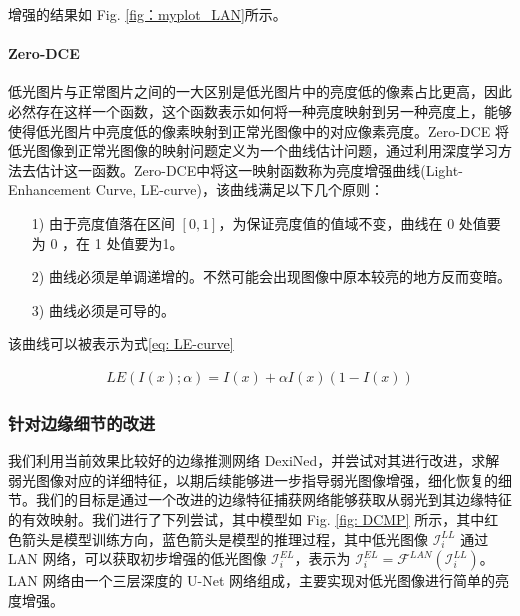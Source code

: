 \documentclass[a4paper]{ctexart}
\begin{document}
		增强的结果如 Fig. \ref{fig：myplot_LAN}所示。
		
		\paragraph{Zero-DCE} 
		
		低光图片与正常图片之间的一大区别是低光图片中的亮度低的像素占比更高，因此必然存在这样一个函数，这个函数表示如何将一种亮度映射到另一种亮度上，能够使得低光图片中亮度低的像素映射到正常光图像中的对应像素亮度。Zero-DCE 将低光图像到正常光图像的映射问题定义为一个曲线估计问题，通过利用深度学习方法去估计这一函数。Zero-DCE中将这一映射函数称为亮度增强曲线(Light-Enhancement Curve, LE-curve)，该曲线满足以下几个原则：
		
		\begin{itemize}
			\item [1)]
			由于亮度值落在区间 $[0, 1]$，为保证亮度值的值域不变，曲线在 0 处值要为 0 ，在 1 处值要为1。
			
			\item [2)]
			曲线必须是单调递增的。不然可能会出现图像中原本较亮的地方反而变暗。
			
			\item [3)]
			曲线必须是可导的。
			
		\end{itemize}
		
		该曲线可以被表示为式\ref{eq: LE-curve}
		
		\begin{equation}
			\begin{aligned}
				LE(I(x); \alpha) = I(x) + \alpha I(x)(1-I(x))
			\end{aligned}
			\label{eq: LE-curve}
		\end{equation}
		
		\subsubsection{针对边缘细节的改进}
		
		我们利用当前效果比较好的边缘推测网络 DexiNed，并尝试对其进行改进，求解弱光图像对应的详细特征，以期后续能够进一步指导弱光图像增强，细化恢复的细节。我们的目标是通过一个改进的边缘特征捕获网络能够获取从弱光到其边缘特征的有效映射。我们进行了下列尝试，其中模型如 Fig. \ref{fig: DCMP} 所示，其中红色箭头是模型训练方向，蓝色箭头是模型的推理过程，其中低光图像 $\mathcal{I}_{i}^{LL}$ 通过 LAN 网络，可以获取初步增强的低光图像 $\mathcal{I}_{i}^{EL}$，表示为 $\mathcal{I}_{i}^{EL} = \mathcal{F}^{LAN} (\mathcal{I}_{i}^{LL})$。LAN 网络由一个三层深度的 U-Net 网络组成，主要实现对低光图像进行简单的亮度增强。
		
\end{document}
